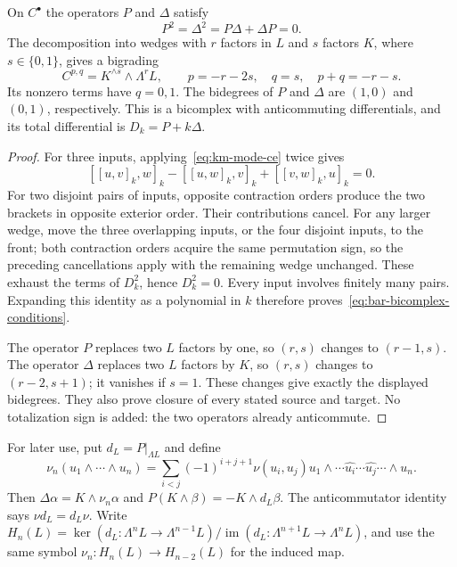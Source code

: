 \begin{theorem}\label{thm:km-bar-bicomplex}
On $C^\bullet$ the operators $P$ and $\Delta$ satisfy
\begin{equation}\label{eq:bar-bicomplex-conditions}
P^2=\Delta^2=P\Delta+\Delta P=0.
\end{equation}
The decomposition into wedges with $r$ factors in $L$ and $s$ factors $K$,
where $s\in\{0,1\}$, gives a bigrading
\[
C^{p,q}=K^{\wedge s}\wedge\Lambda^rL,
\qquad p=-r-2s,\quad q=s,\quad p+q=-r-s.
\]
Its nonzero terms have $q=0,1$.  The bidegrees of $P$ and $\Delta$ are
$(1,0)$ and $(0,1)$, respectively.  This is a bicomplex with anticommuting
differentials, and its total differential is $D_k=P+k\Delta$.
\end{theorem}
\begin{proof}
For three inputs, applying~\eqref{eq:km-mode-ce} twice gives
\[
[[u,v]_k,w]_k-[[u,w]_k,v]_k+[[v,w]_k,u]_k=0.
\]
For two disjoint pairs of inputs, opposite contraction orders produce the
two brackets in opposite exterior order.  Their contributions cancel.
For any larger wedge, move the three overlapping inputs, or the four
disjoint inputs, to the front; both contraction orders acquire the same
permutation sign, so the preceding cancellations apply with the remaining
wedge unchanged.  These exhaust the terms of $D_k^2$, hence $D_k^2=0$.
Every input involves finitely many pairs.  Expanding this identity as a
polynomial in $k$ therefore proves~\eqref{eq:bar-bicomplex-conditions}.

The operator $P$ replaces two $L$ factors by one, so $(r,s)$ changes to
$(r-1,s)$.  The operator $\Delta$ replaces two $L$ factors by $K$, so
$(r,s)$ changes to $(r-2,s+1)$; it vanishes if $s=1$.
These changes give exactly the displayed bidegrees.  They also prove
closure of every stated source and target.  No totalization sign is added:
the two operators already anticommute.
\end{proof}

For later use, put $d_L=P|_{\Lambda L}$ and define
\[
\nu_n(u_1\wedge\cdots\wedge u_n)
=\sum_{i<j}(-1)^{i+j+1}\nu(u_i,u_j)
 u_1\wedge\cdots\widehat{u_i}\cdots\widehat{u_j}\cdots\wedge u_n.
\]
Then $\Delta\alpha=K\wedge\nu_n\alpha$ and
$P(K\wedge\beta)=-K\wedge d_L\beta$.
The anticommutator identity says $\nu d_L=d_L\nu$.
Write $H_n(L)=\ker(d_L:\Lambda^nL\to\Lambda^{n-1}L)/
\operatorname{im}(d_L:\Lambda^{n+1}L\to\Lambda^nL)$, and use the same symbol
$\nu_n:H_n(L)\to H_{n-2}(L)$ for the induced map.


